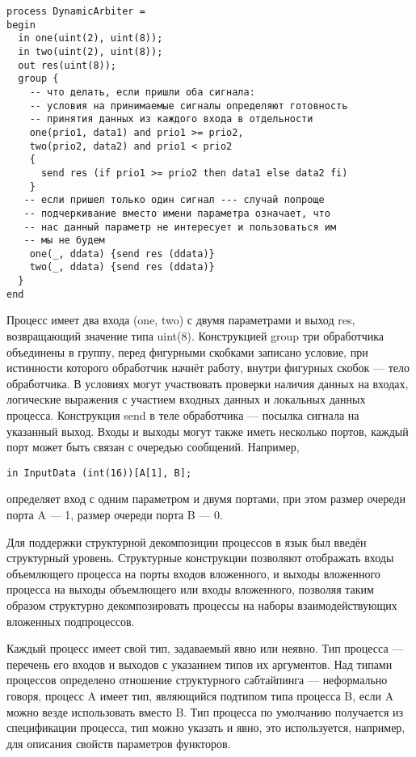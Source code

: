\vspace{5mm}
\begin{minipage}{\linewidth}
\begin{verbatim}
process DynamicArbiter =
begin
  in one(uint(2), uint(8));
  in two(uint(2), uint(8));
  out res(uint(8));
  group {
    -- что делать, если пришли оба сигнала:
    -- условия на принимаемые сигналы определяют готовность
    -- принятия данных из каждого входа в отдельности
    one(prio1, data1) and prio1 >= prio2,
    two(prio2, data2) and prio1 < prio2
    {
      send res (if prio1 >= prio2 then data1 else data2 fi)
    }
   -- если пришел только один сигнал --- случай попроще
   -- подчеркивание вместо имени параметра означает, что
   -- нас данный параметр не интересует и пользоваться им
   -- мы не будем
    one(_, ddata) {send res (ddata)}
    two(_, ddata) {send res (ddata)}
  }
end
\end{verbatim}
\end{minipage}
\vspace{5mm}

Процесс имеет два входа (one, two) с двумя параметрами и выход res, возвращающий значение 
типа uint(8). Конструкцией group три обработчика объединены в группу, перед фигурными 
скобками записано условие, при истинности которого обработчик начнёт работу, внутри 
фигурных скобок --- тело обработчика. В условиях могут участвовать проверки наличия 
данных на входах, логические выражения с участием входных данных и локальных данных 
процесса. Конструкция send в теле обработчика --- посылка сигнала на указанный выход. 
Входы и выходы могут также иметь несколько портов, каждый порт может быть связан с 
очередью сообщений. Например,

\begin{verbatim}
in InputData (int(16))[A[1], B];
\end{verbatim}
определяет вход с одним параметром и двумя портами, при этом размер очереди порта 
A --- 1, размер очереди порта B --- 0.

Для поддержки структурной декомпозиции процессов в язык был введён структурный уровень. 
Структурные конструкции позволяют отображать входы объемлющего процесса на порты входов 
вложенного, и выходы вложенного процесса на выходы объемлющего или входы вложенного, 
позволяя таким образом структурно декомпозировать процессы на наборы взаимодействующих 
вложенных подпроцессов.

Каждый процесс имеет свой тип, задаваемый явно или неявно. Тип процесса --- перечень 
его входов и выходов с указанием типов их аргументов. Над типами процессов определено 
отношение структурного сабтайпинга --- неформально говоря, процесс A имеет тип, являющийся 
подтипом типа процесса B, если A можно везде использовать вместо B. Тип процесса по 
умолчанию получается из спецификации процесса, тип можно указать и явно, это используется, 
например, для описания свойств параметров функторов.

